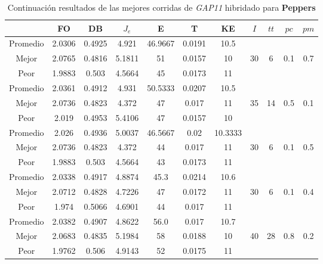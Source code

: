 \begin{table}[h!]
    \footnotesize
    \begin{center}
        \begin{tabular}{|c|c|c|c|c|c|c|c|c|c|c|}
        \hline
             & {\bf FO} & {\bf DB} & $J_e$ & {\bf E} & {\bf T} & {\bf KE} & $I$ & $tt$ & $pc$ & $pm$ \\
        \hline
        \hline
            Promedio  & 2.0306 & 0.4925 & 4.921 & 46.9667 & 0.0191 & 10.5 &  &  &  & \\
            \cline{1-7}
            Mejor & 2.0765 & 0.4816  & 5.1811 & 51 & 0.0157 & 10 & 30 & 6 & 0.1 & 0.7\\
            \cline{1-7}
            Peor & 1.9883 & 0.503  & 4.5664 & 45 & 0.0173 & 11 &  &  &  & \\
        \hline
        \hline
            Promedio  & 2.0361 & 0.4912 & 4.931 & 50.5333 & 0.0207 & 10.5 &  &  &  & \\
            \cline{1-7}
            Mejor & 2.0736 & 0.4823  & 4.372 & 47 & 0.017 & 11 & 35 & 14 & 0.5 & 0.1\\
            \cline{1-7}
            Peor & 2.019 & 0.4953  & 5.4106 & 47 & 0.0157 & 10 &  &  &  & \\
        \hline
        \hline
            Promedio  & 2.026 & 0.4936 & 5.0037 & 46.5667 & 0.02 & 10.3333 &  &  &  & \\
            \cline{1-7}
            Mejor & 2.0736 & 0.4823  & 4.372 & 44 & 0.017 & 11 & 30 & 6 & 0.1 & 0.5\\
            \cline{1-7}
            Peor & 1.9883 & 0.503  & 4.5664 & 43 & 0.0173 & 11 &  &  &  & \\
        \hline
        \hline
            Promedio  & 2.0338 & 0.4917 & 4.8874 & 45.3 & 0.0214 & 10.6 &  &  &  & \\
            \cline{1-7}
            Mejor & 2.0712 & 0.4828  & 4.7226 & 47 & 0.0172 & 11 & 30 & 6 & 0.1 & 0.4\\
            \cline{1-7}
            Peor & 1.974 & 0.5066  & 4.6901 & 44 & 0.017 & 11 &  &  &  & \\
        \hline
        \hline
            Promedio  & 2.0382 & 0.4907 & 4.8622 & 56.0 & 0.017 & 10.7 &  &  &  & \\
            \cline{1-7}
            Mejor & 2.0683 & 0.4835  & 5.1984 & 58 & 0.0188 & 10 & 40 & 28 & 0.8 & 0.2\\
            \cline{1-7}
            Peor & 1.9762 & 0.506  & 4.9143 & 52 & 0.0175 & 11 &  &  &  & \\
        \hline
        \end{tabular}
        \caption{Continuaci\'on resultados de las mejores corridas de \emph{GAP11} hibridado para {\bf Peppers}}
        \label{tb:tablecGAP11}
    \end{center}
\end{table}
